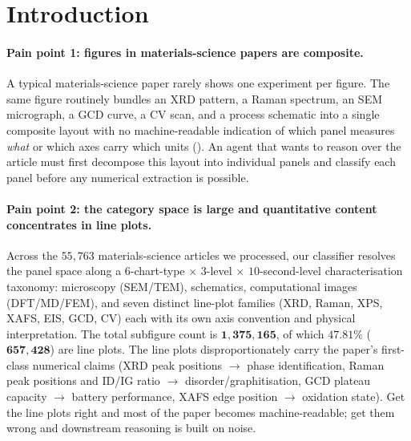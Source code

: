 \documentclass{article}
\begin{document}
\section{Introduction}
\label{sec:intro}

\paragraph{Pain point 1: figures in materials-science papers are composite.}
A typical materials-science paper rarely shows one experiment per
figure. The same figure routinely bundles an XRD pattern, a
Raman spectrum, an SEM micrograph, a GCD curve, a CV scan, and a
process schematic into a single composite layout with no
machine-readable indication of which panel measures \emph{what} or
which axes carry which units (). An agent that
wants to reason over the article must first decompose this layout
into individual panels and classify each panel before any
numerical extraction is possible.

\paragraph{Pain point 2: the category space is large and quantitative content concentrates in line plots.}
Across the $55{,}763$ materials-science articles we processed, our
classifier resolves the panel space along a $6$-chart-type
$\times$ $3$-level $\times$ $10$-second-level characterisation
taxonomy: microscopy (SEM/TEM), schematics, computational images
(DFT/MD/FEM), and seven distinct line-plot families
(XRD, Raman, XPS, XAFS, EIS, GCD, CV) each with its own axis
convention and physical interpretation. The total subfigure count
is $\mathbf{1{,}375{,}165}$, of which $\mathbf{47.81\%}$
($\mathbf{657{,}428}$) are line plots. The line plots
disproportionately carry the paper's first-class numerical claims
(XRD peak positions $\to$ phase identification, Raman peak
positions and ID/IG ratio $\to$ disorder/graphitisation, GCD
plateau capacity $\to$ battery performance, XAFS edge position
$\to$ oxidation state). Get the line plots right and most of the
paper becomes machine-readable; get them wrong and downstream
reasoning is built on noise.
\end{document}
